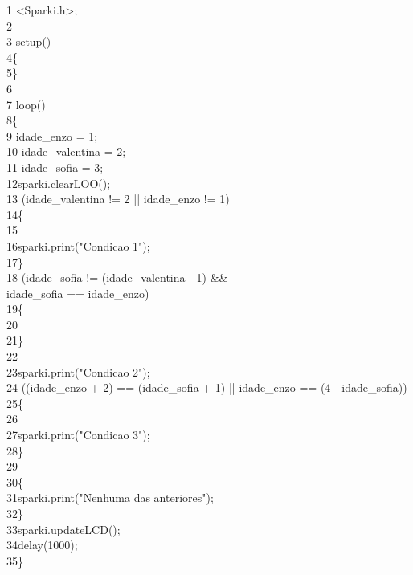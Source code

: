 \documentclass[conference]{IEEEtran}
\begin{document}
{\selectfont 
{\color{cinza}1} <Sparki.h>;\\
{\color{cinza}2}\quad\\
{\color{cinza}3} setup()\\
{\color{cinza}4}\quad\{\\
{\color{cinza}5}\quad\}\\
{\color{cinza}6}\quad\\
{\color{cinza}7} loop()\\
{\color{cinza}8}\quad\{\\
{\color{cinza}9}\quad{} idade\_enzo = 1;\\
{\color{cinza}10}\quad{} idade\_valentina = 2;\\
{\color{cinza}11}\quad{} idade\_sofia = 3;\\
{\color{cinza}12}\quad\quad sparki.clearLOO();\\
{\color{cinza}13}\quad{} (idade\_valentina != 2 {\color{verde}||} idade\_enzo != 1)\\
{\color{cinza}14}\quad\quad\{\\
{\color{cinza}15}\quad\quad{}\\
{\color{cinza}16}\quad\quad\quad sparki.print("Condicao 1");\\
{\color{cinza}17}\quad\quad\}\\
{\color{cinza}18}\quad{} (idade\_sofia != (idade\_valentina - 1) {\color{verde}\&\&\\} idade\_sofia == idade\_enzo)\\
{\color{cinza}19}\quad\quad\{\\
{\color{cinza}20}\quad\quad{}\\
{\color{cinza}21}\quad\quad\}\\
{\color{cinza}22}\\
{\color{cinza}23}\quad sparki.print("Condicao 2");\\
{\color{cinza}24} ((idade\_enzo + 2) == (idade\_sofia + 1) {\color{verde}||} idade\_enzo == (4 - idade\_sofia))\\
{\color{cinza}25}\quad\{\\
{\color{cinza}26}\quad{}\\
{\color{cinza}27}\quad\quad sparki.print("Condicao 3");\\
{\color{cinza}28}\quad\}\\
{\color{cinza}29}\\
{\color{cinza}30}\quad\{\\
{\color{cinza}31}\quad\quad sparki.print("Nenhuma das anteriores");\\
{\color{cinza}32}\quad\}\\
{\color{cinza}33}\quad sparki.updateLCD();\\
{\color{cinza}34}\quad delay(1000);\\
{\color{cinza}35}\quad\}}
\end{document}
